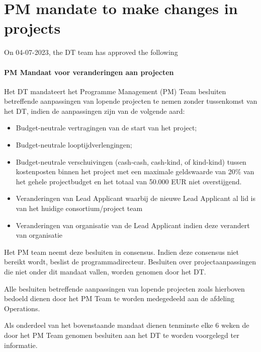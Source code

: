 \section{PM mandate to make changes in projects}
\label{app:pm-mandate}


On 04-07-2023, the DT team has approved the following 
\paragraph{PM Mandaat voor veranderingen aan projecten}
Het DT mandateert het Programme Management (PM) Team besluiten betreffende
aanpassingen van lopende projecten te nemen zonder tussenkomst van het DT, indien de aanpassingen zijn van de volgende
aard:
\begin{itemize}
\item Budget-neutrale vertragingen van de start van het project;
\item Budget-neutrale looptijdverlengingen;
\item Budget-neutrale verschuivingen (cash-cash, cash-kind, of kind-kind) tussen kostenposten binnen het project met een maximale
geldswaarde van 20\% van het gehele projectbudget en het totaal van 50.000 EUR niet overstijgend.
\item Veranderingen van Lead Applicant waarbij de nieuwe Lead Applicant al lid is
van het huidige consortium/project team
\item Veranderingen van organisatie van de Lead Applicant indien deze verandert van organisatie
\end{itemize}

Het PM team neemt deze besluiten in consensus. Indien deze consensus niet
bereikt wordt, beslist de programmadirecteur. Besluiten over projectaanpassingen die niet onder dit mandaat vallen,
worden genomen door het DT.

Alle besluiten betreffende aanpassingen van lopende projecten zoals hierboven
bedoeld dienen door het PM Team te worden medegedeeld aan de afdeling Operations.

Als onderdeel van het bovenstaande mandaat dienen tenminste elke 6 weken de
door het PM Team genomen besluiten aan het DT te worden voorgelegd ter informatie.
